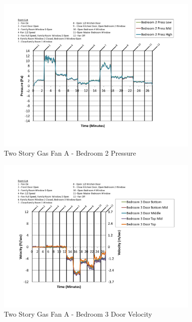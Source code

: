 \documentclass{article}
\begin{document}
\begin{appendices}
	\begin{figure}[H]
		\centering
		\includegraphics[height=3.05in,trim=0.67in 1.1in 0.67in 0.8in,clip=true]{0_Images/Results_Charts/ColdFlow/Two_Story/Gas/A/Bedroom_2_Pressure.pdf}
		\caption{Two Story Gas Fan A - Bedroom 2 Pressure}
	\end{figure}
 

	\begin{figure}[H]
		\centering
		\includegraphics[height=3.05in,trim=0.67in 1.1in 0.67in 0.8in,clip=true]{0_Images/Results_Charts/ColdFlow/Two_Story/Gas/A/Bedroom_3_Door_Velocity.pdf}
		\caption{Two Story Gas Fan A - Bedroom 3 Door Velocity}
	\end{figure}
 
	\clearpage


\end{appendices}
\end{document}
